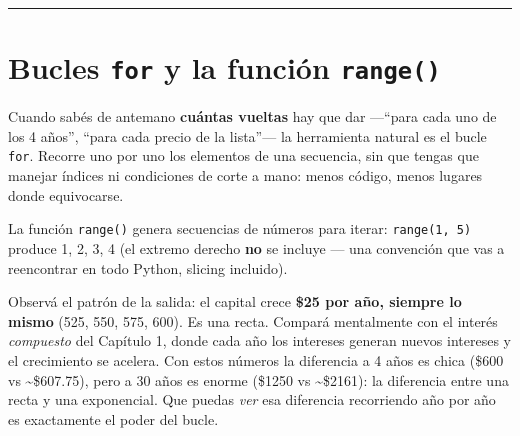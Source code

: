 \documentclass[
  spanish,
  letterpaper,
  DIV=11,
  numbers=noendperiod]{scrreprt}
\newenvironment{Shaded}{\begin{snugshade}}{\end{snugshade}}
\newcommand{\NormalTok}[1]{\textcolor[rgb]{0.00,0.23,0.31}{#1}}
\begin{document}
\begin{center}\rule{0.5\linewidth}{0.5pt}\end{center}

\section{\texorpdfstring{Bucles \texttt{for} y la función
\texttt{range()}}{Bucles for y la función range()}}\label{bucles-for-y-la-funciuxf3n-range}

Cuando sabés de antemano \textbf{cuántas vueltas} hay que dar ---``para
cada uno de los 4 años'', ``para cada precio de la lista''--- la
herramienta natural es el bucle \texttt{for}. Recorre uno por uno los
elementos de una secuencia, sin que tengas que manejar índices ni
condiciones de corte a mano: menos código, menos lugares donde
equivocarse.

La función \texttt{range()} genera secuencias de números para iterar:
\texttt{range(1,\ 5)} produce 1, 2, 3, 4 (el extremo derecho \textbf{no}
se incluye --- una convención que vas a reencontrar en todo Python,
slicing incluido).

\begin{Shaded}
\end{Shaded}

Observá el patrón de la salida: el capital crece \textbf{\$25 por año,
siempre lo mismo} (525, 550, 575, 600). Es una recta. Compará
mentalmente con el interés \emph{compuesto} del Capítulo 1, donde cada
año los intereses generan nuevos intereses y el crecimiento se acelera.
Con estos números la diferencia a 4 años es chica (\$600 vs
\textasciitilde\$607.75), pero a 30 años es enorme (\$1250 vs
\textasciitilde\$2161): la diferencia entre una recta y una exponencial.
Que puedas \emph{ver} esa diferencia recorriendo año por año es
exactamente el poder del bucle.
\end{document}
